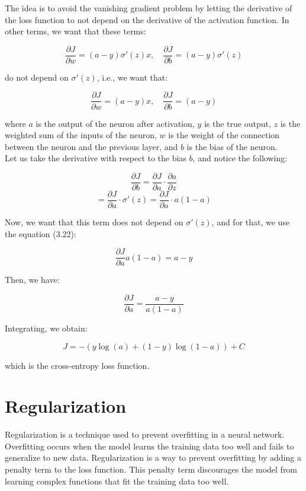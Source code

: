 The idea is to avoid the vanishing gradient problem by letting the derivative
of the loss function to not depend on the derivative of the activation function.
In other terms, we want that these terms:

$$\frac{\partial J}{\partial w} = (a - y) \sigma'(z) x , \quad \frac{\partial J}{\partial b} = (a - y) \sigma'(z)$$

do not depend on $\sigma'(z)$, i.e., we want that:

\begin{equation}
    \frac{\partial J}{\partial w} = (a - y) x , \quad \frac{\partial J}{\partial b} = (a - y)
\end{equation}

where $a$ is the output of the neuron after activation, $y$ is the true output, $z$
is the weighted sum of the inputs of the neuron, $w$ is the weight of the connection
between the neuron and the previous layer, and $b$ is the bias of the neuron.\\

Let us take the derivative with respect to the bias $b$, and notice the following:

$$\frac{\partial J}{\partial b} = \frac{\partial J}{\partial a} \cdot \frac{\partial a}{\partial z}$$
$$ = \frac{\partial J}{\partial a} \cdot \sigma'(z) = \frac{\partial J}{\partial a} \cdot a (1 - a)$$

Now, we want that this term does not depend on $\sigma'(z)$, and for that, we 
use the equation (3.22):

$$\frac{\partial J}{\partial a} a (1 - a) = a - y$$

Then, we have:

$$\frac{\partial J}{\partial a} = \frac{a - y}{a (1 - a)}$$

Integrating, we obtain:

$$J = - ( y \log(a) + (1 - y) \log(1 - a)) + C$$

which is the cross-entropy loss function.\\

\section{Regularization}

Regularization is a technique used to prevent overfitting in a neural network.
Overfitting occurs when the model learns the training data too well and fails
to generalize to new data. Regularization is a way to prevent overfitting by
adding a penalty term to the loss function. This penalty term discourages the
model from learning complex functions that fit the training data too well.\\

